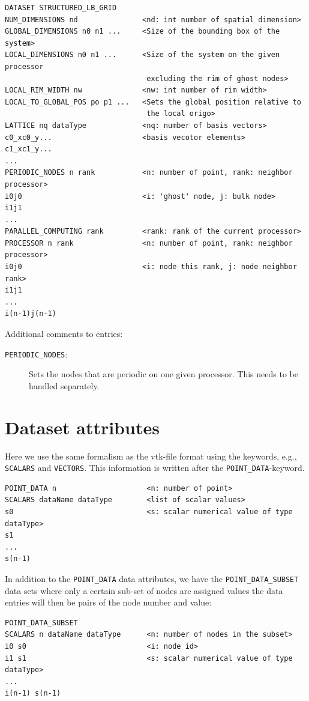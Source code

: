 \documentclass[11pt,a4paper]{report}
\begin{document}
\begin{verbatim}
DATASET STRUCTURED_LB_GRID
NUM_DIMENSIONS nd               <nd: int number of spatial dimension>
GLOBAL_DIMENSIONS n0 n1 ...     <Size of the bounding box of the system>
LOCAL_DIMENSIONS n0 n1 ...      <Size of the system on the given processor 
                                 excluding the rim of ghost nodes>
LOCAL_RIM_WIDTH nw              <nw: int number of rim width>
LOCAL_TO_GLOBAL_POS po p1 ...   <Sets the global position relative to 
                                 the local origo>
LATTICE nq dataType             <nq: number of basis vectors>
c0_xc0_y...                     <basis vecotor elements>
c1_xc1_y...
...
PERIODIC_NODES n rank           <n: number of point, rank: neighbor processor>
i0j0                            <i: 'ghost' node, j: bulk node> 
i1j1 
...
PARALLEL_COMPUTING rank         <rank: rank of the current processor>
PROCESSOR n rank                <n: number of point, rank: neighbor processor>
i0j0                            <i: node this rank, j: node neighbor rank>
i1j1
...
i(n-1)j(n-1)
\end{verbatim}
Additional comments to entries:
\begin{description}
\item[\texttt{PERIODIC{\_}NODES}:] Sets the nodes that are periodic on one given processor. This needs to be handled separately.	
\end{description}	
	
\section{Dataset attributes}
Here we use the same formalism as the vtk-file format using the keywords, e.g., \texttt{SCALARS} and \texttt{VECTORS}. This information is written after the \texttt{POINT{\_}DATA}-keyword.
\begin{verbatim}
POINT_DATA n                     <n: number of point>
SCALARS dataName dataType        <list of scalar values>
s0                               <s: scalar numerical value of type dataType>
s1
...
s(n-1)
\end{verbatim}
In addition to the \texttt{POINT{\_}DATA} data attributes, we have the \texttt{POINT{\_}DATA{\_}SUBSET} data sets where only a certain sub-set of nodes are assigned values the data entries will then be pairs of the node number and value:
\begin{verbatim}
POINT_DATA_SUBSET            
SCALARS n dataName dataType      <n: number of nodes in the subset>
i0 s0                            <i: node id>
i1 s1                            <s: scalar numerical value of type dataType>
...
i(n-1) s(n-1)
\end{verbatim}
\end{document}
